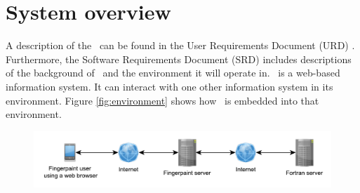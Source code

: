 \chapter{System overview}
\label{chap:systoverview}
A description of the \applicationname\ can be found in the User Requirements Document (URD) \cite{urd}. Furthermore, the Software Requirements Document (SRD) \cite{srd} includes descriptions of the background of \projectname\ and the environment it will operate in.
\projectname\ is a web-based information system. It can interact with one other information system in its environment. Figure \ref{fig:environment} shows how \projectname\ is embedded into that environment.

\begin{figure}[h!]
\begin{center}
\includegraphics[keepaspectratio=true,width=450pt]{Environment.pdf}
\end{center}
\end{figure}

